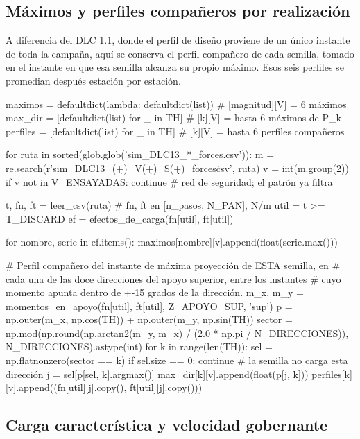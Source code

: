 \subsection*{Máximos y perfiles compañeros por realización}

A diferencia del DLC 1.1, donde el perfil de diseño proviene de un único instante de toda la campaña, aquí se conserva el perfil compañero de cada semilla, tomado en el instante en que esa semilla alcanza su propio máximo. Esos seis perfiles se promedian después estación por estación.

\begin{pycode}
maximos  = defaultdict(lambda: defaultdict(list))  # [magnitud][V] = 6 máximos
max_dir  = [defaultdict(list) for _ in TH]         # [k][V] = hasta 6 máximos de P_k
perfiles = [defaultdict(list) for _ in TH]         # [k][V] = hasta 6 perfiles compañeros

for ruta in sorted(glob.glob('sim_DLC13_*_forces.csv')):
    m = re.search(r'sim_DLC13_(\d+)_V(\d+)_S(\d+)_forces\.csv', ruta)
    v = int(m.group(2))
    if v not in V_ENSAYADAS:
        continue                      # red de seguridad; el patrón ya filtra

    t, fn, ft = leer_csv(ruta)        # fn, ft en [n_pasos, N_PAN], N/m
    util = t >= T_DISCARD
    ef = efectos_de_carga(fn[util], ft[util])

    for nombre, serie in ef.items():
        maximos[nombre][v].append(float(serie.max()))

    # Perfil compañero del instante de máxima proyección de ESTA semilla, en
    # cada una de las doce direcciones del apoyo superior, entre los instantes
    # cuyo momento apunta dentro de +-15 grados de la dirección.
    m_x, m_y = momentos_en_apoyo(fn[util], ft[util], Z_APOYO_SUP, 'sup')
    p = np.outer(m_x, np.cos(TH)) + np.outer(m_y, np.sin(TH))
    sector = np.mod(np.round(np.arctan2(m_y, m_x) / (2.0 * np.pi / N_DIRECCIONES)),
                    N_DIRECCIONES).astype(int)
    for k in range(len(TH)):
        sel = np.flatnonzero(sector == k)
        if sel.size == 0:
            continue                  # la semilla no carga esta dirección
        j = sel[p[sel, k].argmax()]
        max_dir[k][v].append(float(p[j, k]))
        perfiles[k][v].append((fn[util][j].copy(), ft[util][j].copy()))
\end{pycode}

\subsection*{Carga característica y velocidad gobernante}

